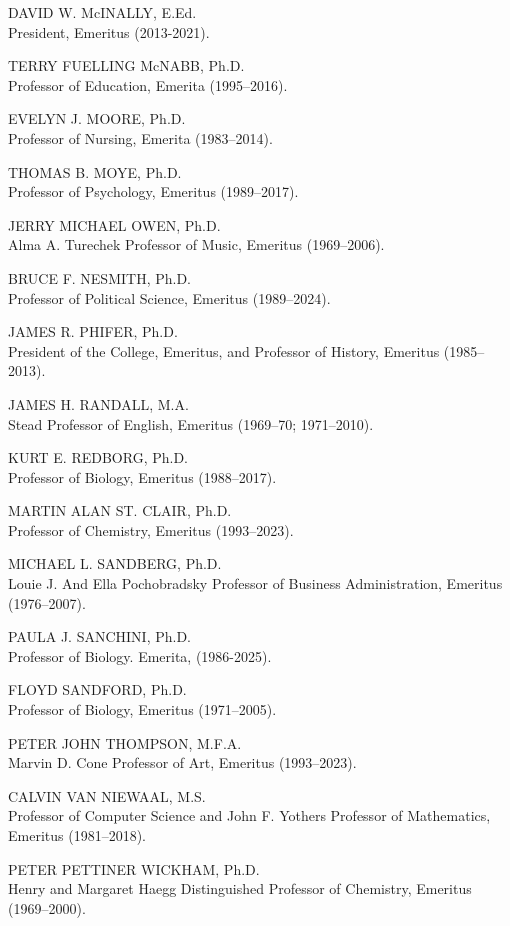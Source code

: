 \documentclass[
  letterpaper,
]{scrbook}
\begin{document}
DAVID W. McINALLY, E.Ed.\\
President, Emeritus (2013-2021).

TERRY FUELLING McNABB, Ph.D.\\
Professor of Education, Emerita (1995--2016).

EVELYN J. MOORE, Ph.D.\\
Professor of Nursing, Emerita (1983--2014).

THOMAS B. MOYE, Ph.D.\\
Professor of Psychology, Emeritus (1989--2017).

JERRY MICHAEL OWEN, Ph.D.\\
Alma A. Turechek Professor of Music, Emeritus (1969--2006).

BRUCE F. NESMITH, Ph.D.\\
Professor of Political Science, Emeritus (1989--2024).

JAMES R. PHIFER, Ph.D.\\
President of the College, Emeritus, and Professor of History, Emeritus
(1985--2013).

JAMES H. RANDALL, M.A.\\
Stead Professor of English, Emeritus (1969--70; 1971--2010).

KURT E. REDBORG, Ph.D.\\
Professor of Biology, Emeritus (1988--2017).

MARTIN ALAN ST. CLAIR, Ph.D.\\
Professor of Chemistry, Emeritus (1993--2023).

MICHAEL L. SANDBERG, Ph.D.\\
Louie J. And Ella Pochobradsky Professor of Business Administration,
Emeritus (1976--2007).

PAULA J. SANCHINI, Ph.D.\\
Professor of Biology. Emerita, (1986-2025).

FLOYD SANDFORD, Ph.D.\\
Professor of Biology, Emeritus (1971--2005).

PETER JOHN THOMPSON, M.F.A.\\
Marvin D. Cone Professor of Art, Emeritus (1993--2023).

CALVIN VAN NIEWAAL, M.S.\\
Professor of Computer Science and John F. Yothers Professor of
Mathematics, Emeritus (1981--2018).

PETER PETTINER WICKHAM, Ph.D.\\
Henry and Margaret Haegg Distinguished Professor of Chemistry, Emeritus
(1969--2000).
\end{document}
